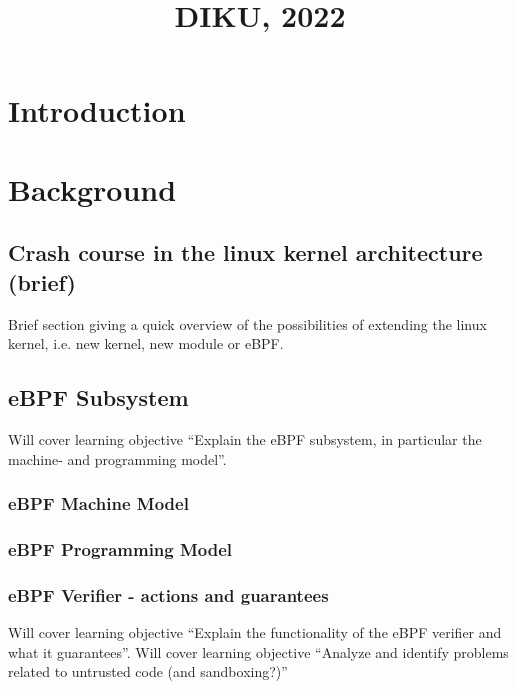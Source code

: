 

\title{\course\small{DIKU, 2022}}


\maketitle

\hrulefill

\section{Introduction}
\label{sec:introduction}

\section{Background}
\label{sec:background}

\subsection{Crash course in the linux kernel architecture (brief)}
\label{subsec:crash_course_in_the_linux_kernel_architecture_(brief)}
Brief section giving a quick overview of the possibilities of extending the linux kernel, i.e. new kernel, new module or eBPF.


\subsection{eBPF Subsystem}
\label{subsec:ebpf_subsystem}
Will cover learning objective ``Explain the eBPF subsystem, in particular the machine- and programming model''.

\subsubsection{eBPF Machine Model}
\subsubsection{eBPF Programming Model}
\subsubsection{eBPF Verifier - actions and guarantees}
Will cover learning objective ``Explain the functionality of the eBPF verifier and what it guarantees''.
Will cover learning objective ``Analyze and identify problems related to untrusted code (and sandboxing?)''

